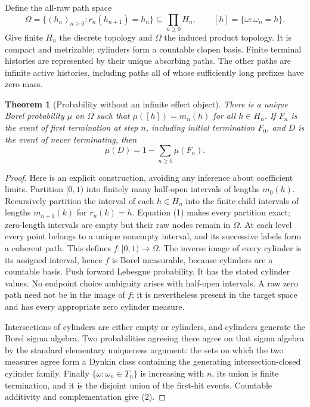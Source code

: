 \documentclass[11pt]{article}
\newtheorem{theorem}{Theorem}\newtheorem{proposition}{Proposition}
\begin{document}
Define the all-raw path space
\[
 \Omega=\{(h_n)_{n\geq0}:r_n(h_{n+1})=h_n\}
 \subseteq\prod_{n\geq0}H_n,
 \qquad [h]=\{\omega:\omega_n=h\}.
\]
Give finite $H_n$ the discrete topology and $\Omega$ the induced product topology. It is compact and metrizable; cylinders form a countable clopen basis. Finite terminal histories are represented by their unique absorbing paths. The other paths are infinite active histories, including paths all of whose sufficiently long prefixes have zero mass.

\begin{theorem}[Probability without an infinite effect object]
There is a unique Borel probability $\mu$ on $\Omega$ such that $\mu([h])=m_n(h)$ for all $h\in H_n$. If $F_n$ is the event of first termination at step $n$, including initial termination $F_0$, and $D$ is the event of never terminating, then
\[
 \mu(D)=1-\sum_{n\geq0}\mu(F_n).                       \tag{2}
\]
\end{theorem}
\begin{proof}
Here is an explicit construction, avoiding any inference about coefficient limits. Partition $[0,1)$ into finitely many half-open intervals of lengths $m_0(h)$. Recursively partition the interval of each $h\in H_n$ into the finite child intervals of lengths $m_{n+1}(k)$ for $r_n(k)=h$. Equation (1) makes every partition exact; zero-length intervals are empty but their raw nodes remain in $\Omega$. At each level every point belongs to a unique nonempty interval, and its successive labels form a coherent path. This defines $f:[0,1)\to\Omega$. The inverse image of every cylinder is its assigned interval, hence $f$ is Borel measurable, because cylinders are a countable basis. Push forward Lebesgue probability. It has the stated cylinder values. No endpoint choice ambiguity arises with half-open intervals. A raw zero path need not be in the image of $f$; it is nevertheless present in the target space and has every appropriate zero cylinder measure.

Intersections of cylinders are either empty or cylinders, and cylinders generate the Borel sigma algebra. Two probabilities agreeing there agree on that sigma algebra by the standard elementary uniqueness argument: the sets on which the two measures agree form a Dynkin class containing the generating intersection-closed cylinder family. Finally $\{\omega:\omega_n\in T_n\}$ is increasing with $n$, its union is finite termination, and it is the disjoint union of the first-hit events. Countable additivity and complementation give (2).
\end{proof}
\end{document}
